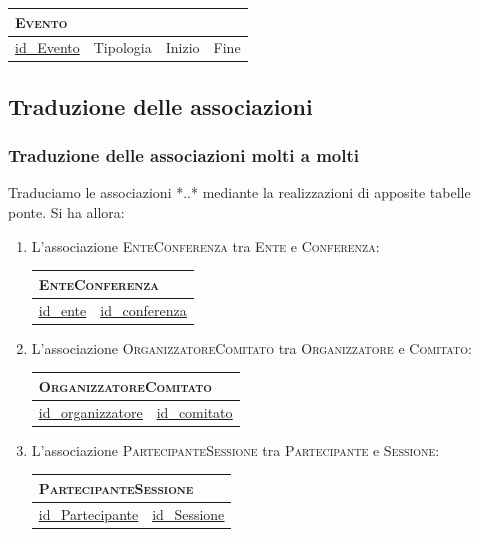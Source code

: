 	\begin{tabular}{|l|l|l|l|}
		\multicolumn{4}{l}{\textsc{Evento}} \\ \hline
		\underline{id\_Evento} & Tipologia & Inizio & Fine \\ \hline
	\end{tabular}

\subsection{Traduzione delle associazioni}
\subsubsection{Traduzione delle associazioni molti a molti}
Traduciamo le associazioni *..* mediante la realizzazioni di apposite tabelle ponte. Si ha allora:
\begin{enumerate}
	\item L'associazione \textsc{EnteConferenza} tra \textsc{Ente} e \textsc{Conferenza}:

		\begin{tabular}{|l|l|}
			\multicolumn{2}{l}{\textsc{EnteConferenza}} \\ \hline
			\underline{\underline{id\_ente}} & \underline{\underline{id\_conferenza}} \\ \hline
		\end{tabular}

\item L'associazione \textsc{OrganizzatoreComitato} tra \textsc{Organizzatore} e \textsc{Comitato}:

	\begin{tabular}{|l|l|}
		\multicolumn{2}{l}{\textsc{OrganizzatoreComitato}} \\ \hline
		\underline{\underline{id\_organizzatore}} & \underline{\underline{id\_comitato}} \\ \hline
	\end{tabular}

\item L'associazione \textsc{PartecipanteSessione} tra \textsc{Partecipante} e \textsc{Sessione}:

	\begin{tabular}{|l|l|}
		\multicolumn{2}{l}{\textsc{PartecipanteSessione}} \\ \hline
		\underline{\underline{id\_Partecipante}} & \underline{\underline{id\_Sessione}} \\ \hline
	\end{tabular}

\end{enumerate}
